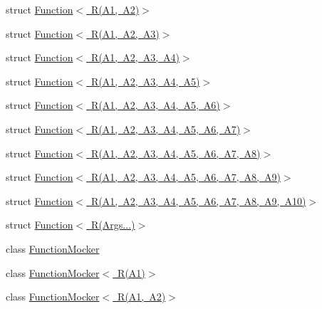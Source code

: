 \begin{DoxyCompactItemize}
\item 
struct \mbox{\hyperlink{structtesting_1_1internal_1_1_function_3_01_r_07_a1_00_01_a2_08_4}{Function$<$ R(\+A1, A2)$>$}}
\item 
struct \mbox{\hyperlink{structtesting_1_1internal_1_1_function_3_01_r_07_a1_00_01_a2_00_01_a3_08_4}{Function$<$ R(\+A1, A2, A3)$>$}}
\item 
struct \mbox{\hyperlink{structtesting_1_1internal_1_1_function_3_01_r_07_a1_00_01_a2_00_01_a3_00_01_a4_08_4}{Function$<$ R(\+A1, A2, A3, A4)$>$}}
\item 
struct \mbox{\hyperlink{structtesting_1_1internal_1_1_function_3_01_r_07_a1_00_01_a2_00_01_a3_00_01_a4_00_01_a5_08_4}{Function$<$ R(\+A1, A2, A3, A4, A5)$>$}}
\item 
struct \mbox{\hyperlink{structtesting_1_1internal_1_1_function_3_01_r_07_a1_00_01_a2_00_01_a3_00_01_a4_00_01_a5_00_01_a6_08_4}{Function$<$ R(\+A1, A2, A3, A4, A5, A6)$>$}}
\item 
struct \mbox{\hyperlink{structtesting_1_1internal_1_1_function_3_01_r_07_a1_00_01_a2_00_01_a3_00_01_a4_00_01_a5_00_01_a6_00_01_a7_08_4}{Function$<$ R(\+A1, A2, A3, A4, A5, A6, A7)$>$}}
\item 
struct \mbox{\hyperlink{structtesting_1_1internal_1_1_function_3_01_r_07_a1_00_01_a2_00_01_a3_00_01_a4_00_01_a5_00_01_a6_00_01_a7_00_01_a8_08_4}{Function$<$ R(\+A1, A2, A3, A4, A5, A6, A7, A8)$>$}}
\item 
struct \mbox{\hyperlink{structtesting_1_1internal_1_1_function_3_01_r_07_a1_00_01_a2_00_01_a3_00_01_a4_00_01_a5_00_01_a6dfab3ccde80824a59fc4efd5336a27c1}{Function$<$ R(\+A1, A2, A3, A4, A5, A6, A7, A8, A9)$>$}}
\item 
struct \mbox{\hyperlink{structtesting_1_1internal_1_1_function_3_01_r_07_a1_00_01_a2_00_01_a3_00_01_a4_00_01_a5_00_01_a6f6ff91550f0557b7708e490e5002cd35}{Function$<$ R(\+A1, A2, A3, A4, A5, A6, A7, A8, A9, A10)$>$}}
\item 
struct \mbox{\hyperlink{structtesting_1_1internal_1_1_function_3_01_r_07_args_8_8_8_08_4}{Function$<$ R(\+Args...)$>$}}
\item 
class \mbox{\hyperlink{classtesting_1_1internal_1_1_function_mocker}{Function\+Mocker}}
\item 
class \mbox{\hyperlink{classtesting_1_1internal_1_1_function_mocker_3_01_r_07_a1_08_4}{Function\+Mocker$<$ R(\+A1)$>$}}
\item 
class \mbox{\hyperlink{classtesting_1_1internal_1_1_function_mocker_3_01_r_07_a1_00_01_a2_08_4}{Function\+Mocker$<$ R(\+A1, A2)$>$}}

\end{DoxyCompactItemize}
